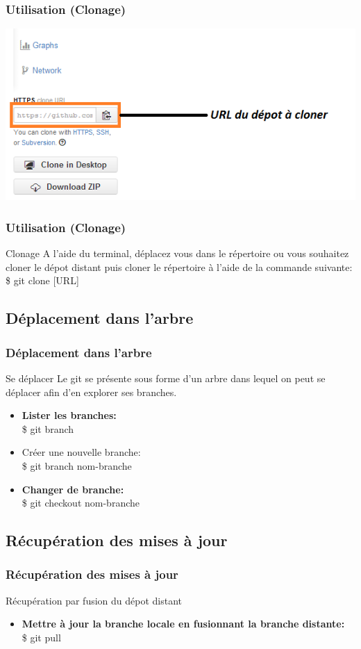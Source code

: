 \documentclass{beamer}
\begin{document}
\begin{frame}
\frametitle{Utilisation (Clonage)}
\includegraphics[scale=0.6]{URLdepot.png}
\end{frame}

\begin{frame}
\frametitle{Utilisation (Clonage)}
\begin{block}{Clonage}
A l'aide du terminal, d\'{e}placez vous dans le r\'{e}pertoire ou vous souhaitez cloner le d\'{e}pot distant puis cloner le r\'{e}pertoire \`{a} l'aide de la commande suivante:\\
\$ git clone [URL]
\end{block}
\end{frame}

\subsection{D\'{e}placement dans l'arbre}
\begin{frame}
\frametitle{D\'{e}placement dans l'arbre}
\begin{block}{Se d\'{e}placer}
Le git se pr\'{e}sente sous forme d'un arbre dans lequel on peut se d\'{e}placer afin d'en explorer ses branches.
\begin{itemize}
\item \textbf{Lister les branches:} \\
\$ git branch
\item Cr\'{e}er une nouvelle branche: \\
\$ git branch nom-branche
\item \textbf{Changer de branche:} \\
\$ git checkout nom-branche
\end{itemize}
\end{block}
\end{frame}

\subsection{R\'{e}cup\'{e}ration des mises \`{a} jour}
\begin{frame}
\frametitle{R\'{e}cup\'{e}ration des mises \`{a} jour}
\begin{block}{R\'{e}cup\'{e}ration par fusion du d\'{e}pot distant}
\begin{itemize}
\item \textbf{Mettre \`{a} jour la branche locale en fusionnant la branche distante:} \\
\$ git pull
\end{itemize}
\end{block}
\end{frame}
\end{document}
